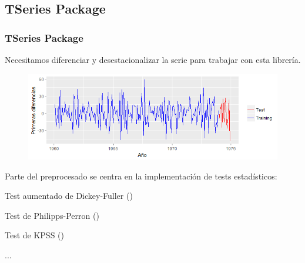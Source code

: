 \documentclass[10pt,a4paper,twoside]{beamer}
\begin{document}

\subsection{TSeries Package}


\begin{frame}
\frametitle{TSeries Package}
Necesitamos diferenciar y desestacionalizar la serie para trabajar con esta librería.

\begin{figure}
    \centering
    \centerline{\includegraphics[scale = 0.5]{Images/323.png}}
\end{figure}

Parte del preprocesado se centra en la implementación de tests estadísticos:
\begin{itemize*}
\item Test aumentado de Dickey-Fuller ()
\item Test de Philipps-Perron ()
\item Test de KPSS ()
\item ...
\end{itemize*}

\end{frame}

\end{document}
